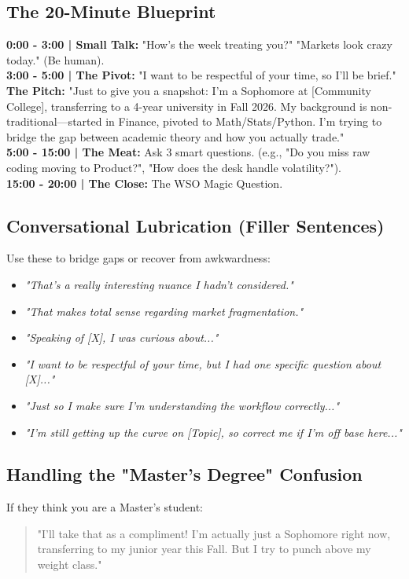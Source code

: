 \documentclass[11pt, a4paper]{article}
\begin{document}
\subsection{The 20-Minute Blueprint}
\textbf{0:00 - 3:00 | Small Talk:} "How's the week treating you?" "Markets look crazy today." (Be human). \\
\textbf{3:00 - 5:00 | The Pivot:} "I want to be respectful of your time, so I'll be brief." \\
\textbf{The Pitch:} "Just to give you a snapshot: I'm a Sophomore at [Community College], transferring to a 4-year university in Fall 2026. My background is non-traditional—started in Finance, pivoted to Math/Stats/Python. I'm trying to bridge the gap between academic theory and how you actually trade." \\
\textbf{5:00 - 15:00 | The Meat:} Ask 3 smart questions. (e.g., "Do you miss raw coding moving to Product?", "How does the desk handle volatility?"). \\
\textbf{15:00 - 20:00 | The Close:} The WSO Magic Question.

\subsection{Conversational Lubrication (Filler Sentences)}
Use these to bridge gaps or recover from awkwardness:
\begin{itemize}
    \item \textit{"That’s a really interesting nuance I hadn't considered."}
    \item \textit{"That makes total sense regarding market fragmentation."}
    \item \textit{"Speaking of [X], I was curious about..."}
    \item \textit{"I want to be respectful of your time, but I had one specific question about [X]..."}
    \item \textit{"Just so I make sure I’m understanding the workflow correctly..."}
    \item \textit{"I’m still getting up the curve on [Topic], so correct me if I’m off base here..."}
\end{itemize}

\subsection{Handling the "Master's Degree" Confusion}
If they think you are a Master's student:
\begin{quote}
    "I’ll take that as a compliment! I’m actually just a Sophomore right now, transferring to my junior year this Fall. But I try to punch above my weight class."
\end{quote}
\end{document}
